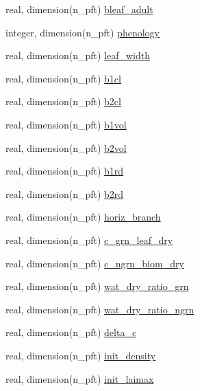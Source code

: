 \begin{DoxyCompactItemize}
\item 
real, dimension(n\+\_\+pft) \hyperlink{namespacepft__coms_a032c88698720a94f7bdeff271ae39844}{bleaf\+\_\+adult}
\item 
integer, dimension(n\+\_\+pft) \hyperlink{namespacepft__coms_a5a3bbf23e4825378c0f3c8bd788c6c68}{phenology}
\item 
real, dimension(n\+\_\+pft) \hyperlink{namespacepft__coms_ac9aba7609beabf8387afac8a12a89d5c}{leaf\+\_\+width}
\item 
real, dimension(n\+\_\+pft) \hyperlink{namespacepft__coms_ad31da22766c6db6bf3f24498eab8d22d}{b1cl}
\item 
real, dimension(n\+\_\+pft) \hyperlink{namespacepft__coms_a382f054406a23a234b101ebf06ff6d5c}{b2cl}
\item 
real, dimension(n\+\_\+pft) \hyperlink{namespacepft__coms_a44136dea8d02d3eba884e01b192a6895}{b1vol}
\item 
real, dimension(n\+\_\+pft) \hyperlink{namespacepft__coms_a54ac66449833305ba8a3c3415044856d}{b2vol}
\item 
real, dimension(n\+\_\+pft) \hyperlink{namespacepft__coms_a012ba0e0102bf2d9db7ef42b187326d5}{b1rd}
\item 
real, dimension(n\+\_\+pft) \hyperlink{namespacepft__coms_abfac20b7a9e8b92da039ecc3b59dfdc3}{b2rd}
\item 
real, dimension(n\+\_\+pft) \hyperlink{namespacepft__coms_a8727392237e76b0ac668b40267b5db14}{horiz\+\_\+branch}
\item 
real, dimension(n\+\_\+pft) \hyperlink{namespacepft__coms_a07a700fcd19f741c23db148885753d33}{c\+\_\+grn\+\_\+leaf\+\_\+dry}
\item 
real, dimension(n\+\_\+pft) \hyperlink{namespacepft__coms_a59778cca6e42ffcda34a2b44b31c0d80}{c\+\_\+ngrn\+\_\+biom\+\_\+dry}
\item 
real, dimension(n\+\_\+pft) \hyperlink{namespacepft__coms_a93b820778e953be06816231daa419ca5}{wat\+\_\+dry\+\_\+ratio\+\_\+grn}
\item 
real, dimension(n\+\_\+pft) \hyperlink{namespacepft__coms_a4228db82826a9e2afbe3646586c0c4ac}{wat\+\_\+dry\+\_\+ratio\+\_\+ngrn}
\item 
real, dimension(n\+\_\+pft) \hyperlink{namespacepft__coms_af5eccca1ecf526e4e6ece4c5e47d2bf8}{delta\+\_\+c}
\item 
real, dimension(n\+\_\+pft) \hyperlink{namespacepft__coms_aad950f9e3b7c51796f0c72acbf85198d}{init\+\_\+density}
\item 
real, dimension(n\+\_\+pft) \hyperlink{namespacepft__coms_aee1c14f39841cdf40c9655ae6eab2e85}{init\+\_\+laimax}

\end{DoxyCompactItemize}
